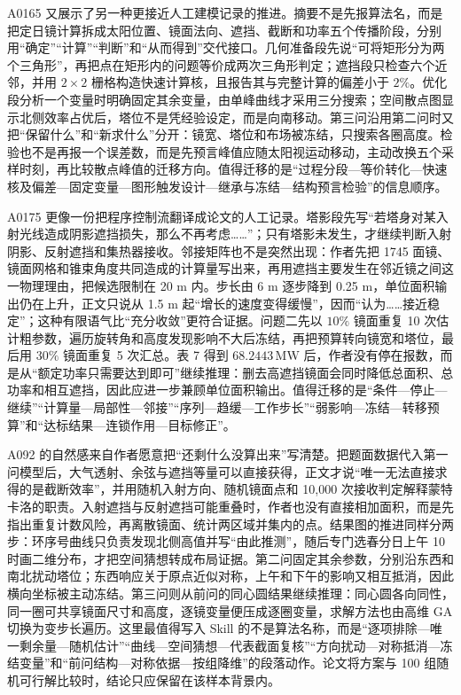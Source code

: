 \documentclass[UTF8,a4paper,12pt]{ctexart}
\begin{document}
A0165 又展示了另一种更接近人工建模记录的推进。摘要不是先报算法名，而是把定日镜计算拆成太阳位置、镜面法向、遮挡、截断和功率五个传播阶段，分别用“确定”“计算”“判断”和“从而得到”交代接口。几何准备段先说“可将矩形分为两个三角形”，再把点在矩形内的问题等价成两次三角形判定；遮挡段只检查六个近邻，并用 $2\times2$ 栅格构造快速计算核，且报告其与完整计算的偏差小于 $2\%$。优化段分析一个变量时明确固定其余变量，由单峰曲线才采用三分搜索；空间散点图显示北侧效率占优后，塔位不是凭经验设定，而是向南移动。第三问沿用第二问时又把“保留什么”和“新求什么”分开：镜宽、塔位和布场被冻结，只搜索各圈高度。检验也不是再报一个误差数，而是先预言峰值应随太阳视运动移动，主动改换五个采样时刻，再比较散点峰值的迁移方向。值得迁移的是“过程分段—等价转化—快速核及偏差—固定变量—图形触发设计—继承与冻结—结构预言检验”的信息顺序。

A0175 更像一份把程序控制流翻译成论文的人工记录。塔影段先写“若塔身对某入射光线造成阴影遮挡损失，那么不再考虑……”；只有塔影未发生，才继续判断入射阴影、反射遮挡和集热器接收。邻接矩阵也不是突然出现：作者先把 1745 面镜、镜面网格和锥束角度共同造成的计算量写出来，再用遮挡主要发生在邻近镜之间这一物理理由，把候选限制在 20 m 内。步长由 6 m 逐步降到 0.25 m，单位面积输出仍在上升，正文只说从 1.5 m 起“增长的速度变得缓慢”，因而“认为……接近稳定”；这种有限语气比“充分收敛”更符合证据。问题二先以 $10\%$ 镜面重复 10 次估计粗参数，遍历旋转角和高度发现影响不大后冻结，再把预算转向镜宽和塔位，最后用 $30\%$ 镜面重复 5 次汇总。表 7 得到 $68.2443\,\mathrm{MW}$ 后，作者没有停在报数，而是从“额定功率只需要达到即可”继续推理：删去高遮挡镜面会同时降低总面积、总功率和相互遮挡，因此应进一步兼顾单位面积输出。值得迁移的是“条件—停止—继续”“计算量—局部性—邻接”“序列—趋缓—工作步长”“弱影响—冻结—转移预算”和“达标结果—连锁作用—目标修正”。

A092 的自然感来自作者愿意把“还剩什么没算出来”写清楚。把题面数据代入第一问模型后，大气透射、余弦与遮挡等量可以直接获得，正文才说“唯一无法直接求得的是截断效率”，并用随机入射方向、随机镜面点和 10,000 次接收判定解释蒙特卡洛的职责。入射遮挡与反射遮挡可能重叠时，作者也没有直接相加面积，而是先指出重复计数风险，再离散镜面、统计两区域并集内的点。结果图的推进同样分两步：环序号曲线只负责发现北侧高值并写“由此推测”，随后专门选春分日上午 10 时画二维分布，才把空间猜想转成布局证据。第二问固定其余参数，分别沿东西和南北扰动塔位；东西响应关于原点近似对称，上午和下午的影响又相互抵消，因此横向坐标被主动冻结。第三问则从前问的同心圆结果继续推理：同心圆各向同性，同一圈可共享镜面尺寸和高度，逐镜变量便压成逐圈变量，求解方法也由高维 GA 切换为变步长遍历。这里最值得写入 Skill 的不是算法名称，而是“逐项排除—唯一剩余量—随机估计”“曲线—空间猜想—代表截面复核”“方向扰动—对称抵消—冻结变量”和“前问结构—对称依据—按组降维”的段落动作。论文将方案与 100 组随机可行解比较时，结论只应保留在该样本背景内。
\end{document}
